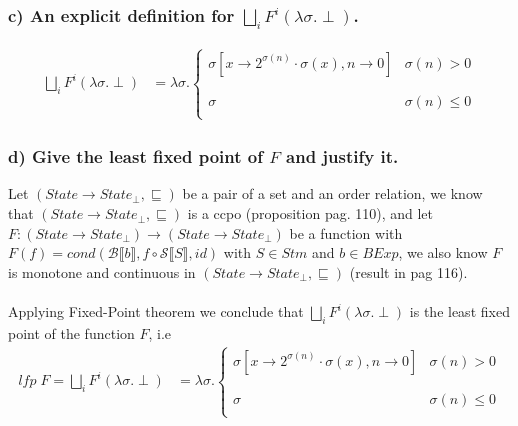 \documentclass{article}
\newcommand{\bcal}{\mathcal{B}}
\newcommand{\scal}{\mathcal{S}}
\newcommand{\bool}[1]{\bcal \llbracket #1 \rrbracket}
\newcommand{\sem}[1]{\scal \llbracket #1 \rrbracket}
\begin{document}
\subsubsection*{c) An explicit definition for $\bigsqcup_i F^i(\lambda\sigma.\perp)$.}
\begin{align*}
\bigsqcup_i F^i(\lambda\sigma.\perp) &= \lambda \sigma . \left\{
\begin{array}{ll}
      \sigma[x\rightarrow 2^{\sigma(n)} \cdot \sigma(x), n \rightarrow 0] & \sigma(n) > 0 \\
      \\ \\
      \sigma & \sigma(n) \leq 0 \\
\end{array} 
\right.
\end{align*}
\subsubsection*{d) Give the least fixed point of $F$ and justify it.}

Let $(State \rightarrow State_{\perp}, \sqsubseteq)$ be a pair of a set and an order relation, we know that $(State \rightarrow State_{\perp}, \sqsubseteq)$ is a ccpo (proposition pag. 110), and let $F: (State \rightarrow State_{\perp}) \longrightarrow (State \rightarrow State_{\perp})$ be a function with $F(f) = cond(\bool{b}, f \circ \sem{S},id)$ with $S \in Stm$ and $b \in BExp$, we also know $F$ is monotone and continuous in $(State \rightarrow State_{\perp}, \sqsubseteq)$ (result in pag 116).\\\\
Applying Fixed-Point theorem we conclude that $\bigsqcup_i F^i(\lambda\sigma.\perp)$ is the least fixed point of the function $F$, i.e\\
\begin{align*}
lfp\;F = \bigsqcup_i F^i(\lambda\sigma.\perp) &= \lambda \sigma . \left\{
\begin{array}{ll}
      \sigma[x\rightarrow 2^{\sigma(n)} \cdot \sigma(x), n \rightarrow 0] & \sigma(n) > 0 \\
      \\ \\
      \sigma & \sigma(n) \leq 0 \\
\end{array} 
\right.
\end{align*}\\
\end{document}
